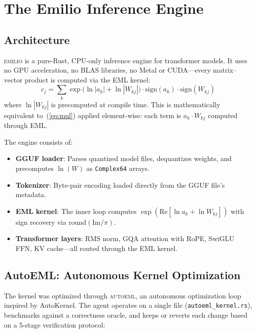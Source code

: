 \documentclass[acmsmall,nonacm]{acmart}
\begin{document}
\section{The Emilio Inference Engine}
\label{sec:emilio}

\subsection{Architecture}

\textsc{emilio} is a pure-Rust, CPU-only inference engine for
transformer models.  It uses no GPU acceleration, no BLAS libraries, no
Metal or CUDA---every matrix--vector product is computed via the EML
kernel:
\begin{equation}\label{eq:kernel}
  c_j = \sum_{k} \exp\!\big(\ln|a_k| + \ln|W_{kj}|\big) \cdot \mathrm{sign}(a_k) \cdot \mathrm{sign}(W_{kj})
\end{equation}
where $\ln|W_{kj}|$ is precomputed at compile time.  This is
mathematically equivalent to~(\ref{eq:mul}) applied element-wise: each
term is $a_k \cdot W_{kj}$ computed through EML.

The engine consists of:
\begin{itemize}
\item \textbf{GGUF loader}: Parses quantized model files, dequantizes
  weights, and precomputes $\ln(W)$ as \texttt{Complex64} arrays.
\item \textbf{Tokenizer}: Byte-pair encoding loaded directly from the
  GGUF file's metadata.
\item \textbf{EML kernel}: The inner loop computes
  $\exp(\mathrm{Re}[\ln a_k + \ln W_{kj}])$ with sign recovery via
  $\mathrm{round}(\mathrm{Im}/\pi)$.
\item \textbf{Transformer layers}: RMS norm, GQA attention with RoPE,
  SwiGLU FFN, KV cache---all routed through the EML kernel.
\end{itemize}

\subsection{AutoEML: Autonomous Kernel Optimization}
\label{subsec:autoeml}

The kernel was optimized through \textsc{autoeml}, an autonomous
optimization loop inspired by AutoKernel.  The agent operates on a
single file (\texttt{autoeml\_kernel.rs}), benchmarks against a
correctness oracle, and keeps or reverts each change based on a
5-stage verification protocol:
\end{document}
